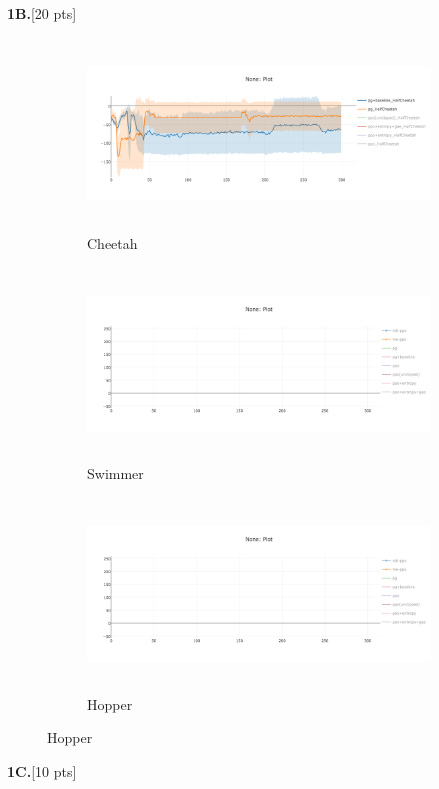 \documentclass[10pt]{article}
\begin{document}
\clearpage 

\textbf{1B.}[20 pts]
\begin{figure}[ht!]
    \centering
    \begin{subfigure}[h]{0.6\linewidth}
        \centering
        \includegraphics[height=2in]{figures/baseline.png}
        \caption{Cheetah}
    \end{subfigure}
    \vskip 0.3in
    \begin{subfigure}[h]{0.6\textwidth}
        \centering
        \includegraphics[height=2in]{figures/newplot.png}
        \caption{Swimmer}
    \end{subfigure}
    \vskip 0.3in
    \begin{subfigure}[h]{0.6\textwidth}
        \centering
        \includegraphics[height=2in]{figures/newplot.png}
        \caption{Hopper}
    \end{subfigure}
\end{figure}
\clearpage
\textbf{1C.}[10 pts]
\end{document}
